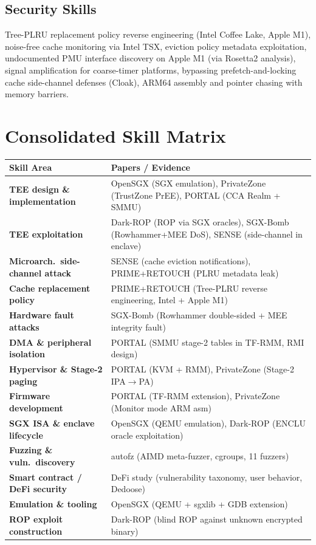 \documentclass[11pt,letterpaper]{article}
\begin{document}
\subsection*{Security Skills}
Tree-PLRU replacement policy reverse engineering (Intel Coffee Lake, Apple M1), noise-free cache monitoring via Intel TSX, eviction policy metadata exploitation, undocumented PMU interface discovery on Apple M1 (via Rosetta2 analysis), signal amplification for coarse-timer platforms, bypassing prefetch-and-locking cache side-channel defenses (Cloak), ARM64 assembly and pointer chasing with memory barriers.

\newpage

\section*{Consolidated Skill Matrix}

\begin{center}
\renewcommand{\arraystretch}{1.5}
\begin{tabular}{>{\bfseries}p{4.2cm} p{9.8cm}}
\toprule
Skill Area & Papers / Evidence \\
\midrule
TEE design \& implementation
  & OpenSGX (SGX emulation), PrivateZone (TrustZone PrEE), PORTAL (CCA Realm + SMMU) \\
TEE exploitation
  & Dark-ROP (ROP via SGX oracles), SGX-Bomb (Rowhammer+MEE DoS), SENSE (side-channel in enclave) \\
Microarch.\ side-channel attack
  & SENSE (cache eviction notifications), PRIME+RETOUCH (PLRU metadata leak) \\
Cache replacement policy
  & PRIME+RETOUCH (Tree-PLRU reverse engineering, Intel + Apple M1) \\
Hardware fault attacks
  & SGX-Bomb (Rowhammer double-sided + MEE integrity fault) \\
DMA \& peripheral isolation
  & PORTAL (SMMU stage-2 tables in TF-RMM, RMI design) \\
Hypervisor \& Stage-2 paging
  & PORTAL (KVM + RMM), PrivateZone (Stage-2 IPA$\to$PA) \\
Firmware development
  & PORTAL (TF-RMM extension), PrivateZone (Monitor mode ARM asm) \\
SGX ISA \& enclave lifecycle
  & OpenSGX (QEMU emulation), Dark-ROP (ENCLU oracle exploitation) \\
Fuzzing \& vuln.\ discovery
  & autofz (AIMD meta-fuzzer, cgroups, 11 fuzzers) \\
Smart contract / DeFi security
  & DeFi study (vulnerability taxonomy, user behavior, Dedoose) \\
Emulation \& tooling
  & OpenSGX (QEMU + sgxlib + GDB extension) \\
ROP exploit construction
  & Dark-ROP (blind ROP against unknown encrypted binary) \\
\bottomrule
\end{tabular}
\end{center}
\end{document}
